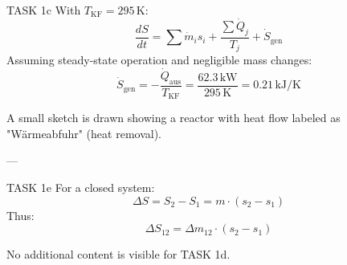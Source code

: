 TASK 1c  
With \( T_{\text{KF}} = 295 \, \text{K} \):  
\[
\frac{dS}{dt} = \sum \dot{m}_i s_i + \frac{\sum \dot{Q}_j}{T_j} + \dot{S}_{\text{gen}}
\]  
Assuming steady-state operation and negligible mass changes:  
\[
\dot{S}_{\text{gen}} = -\frac{\dot{Q}_{\text{aus}}}{T_{\text{KF}}} = \frac{62.3 \, \text{kW}}{295 \, \text{K}} = 0.21 \, \text{kJ/K}
\]  

A small sketch is drawn showing a reactor with heat flow labeled as "Wärmeabfuhr" (heat removal).  

---

TASK 1e  
For a closed system:  
\[
\Delta S = S_2 - S_1 = m \cdot (s_2 - s_1)
\]  
Thus:  
\[
\Delta S_{12} = \Delta m_{12} \cdot (s_2 - s_1)
\]  

No additional content is visible for TASK 1d.